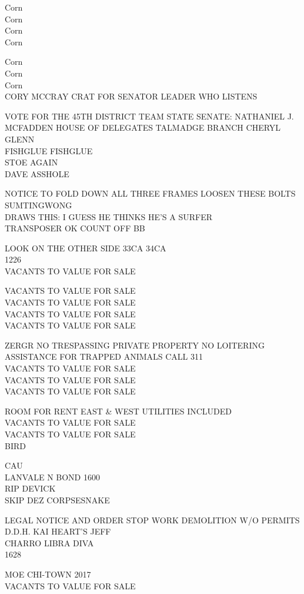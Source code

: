 \documentclass[10pt,letterpaper]{article}
\begin{document}
Corn\\
Corn\\
Corn\\
Corn

Corn\\
Corn\\
Corn\\
CORY MCCRAY CRAT FOR SENATOR LEADER WHO LISTENS

VOTE FOR THE 45TH DISTRICT TEAM STATE SENATE: NATHANIEL J. MCFADDEN HOUSE OF DELEGATES TALMADGE BRANCH CHERYL GLENN\\
FISHGLUE FISHGLUE\\
STOE AGAIN\\
DAVE ASSHOLE

NOTICE TO FOLD DOWN ALL THREE FRAMES LOOSEN THESE BOLTS SUMTINGWONG\\
DRAWS THIS: I GUESS HE THINKS HE'S A SURFER\\
TRANSPOSER OK COUNT OFF BB

LOOK ON THE OTHER SIDE 33CA 34CA\\
1226\\
VACANTS TO VALUE FOR SALE

VACANTS TO VALUE FOR SALE\\
VACANTS TO VALUE FOR SALE\\
VACANTS TO VALUE FOR SALE\\
VACANTS TO VALUE FOR SALE

ZERGR NO TRESPASSING PRIVATE PROPERTY NO LOITERING ASSISTANCE FOR TRAPPED ANIMALS CALL 311\\
VACANTS TO VALUE FOR SALE\\
VACANTS TO VALUE FOR SALE\\
VACANTS TO VALUE FOR SALE

ROOM FOR RENT EAST \& WEST UTILITIES INCLUDED\\
VACANTS TO VALUE FOR SALE\\
VACANTS TO VALUE FOR SALE\\
BIRD

CAU\\
LANVALE N BOND 1600\\
RIP DEVICK\\
SKIP DEZ CORPSESNAKE

LEGAL NOTICE AND ORDER STOP WORK DEMOLITION W/O PERMITS\\
D.D.H. KAI HEART'S JEFF\\
CHARRO LIBRA DIVA\\
1628

MOE CHI{-}TOWN 2017\\
VACANTS TO VALUE FOR SALE
\end{document}
